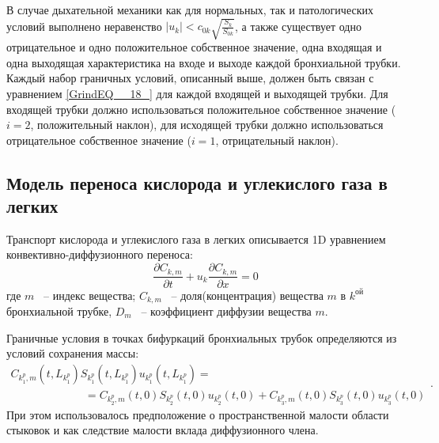 В случае дыхательной механики как для нормальных, так и патологических условий выполнено неравенство $\left|u_{k} \right|<c_{0k} \sqrt{\frac{S_{k} }{S_{0k} } } $, а также существует одно отрицательное и одно положительное собственное значение, одна входящая и одна выходящая характеристика на входе и выходе каждой бронхиальной трубки. Каждый набор граничных условий, описанный выше, должен быть связан с уравнением \eqref{GrindEQ__18_} для каждой входящей и выходящей трубки. Для входящей трубки должно использоваться положительное собственное значение ($i=2$, положительный наклон), для исходящей трубки должно использоваться отрицательное собственное значение ($i=1$, отрицательный наклон).

\subsection{Модель переноса кислорода и углекислого газа в легких}

Транспорт кислорода и углекислого газа в легких описывается 1D уравнением конвективно-диффузионного переноса:
\begin{equation} \label{GrindEQ__19_} 
\frac{\partial C_{k,m} }{\partial t} +u_{k} \frac{\partial C_{k,m} }{\partial x} =0  
\end{equation} 
где $m$ ~-- индекс вещества; $C_{k,m} $ ~-- доля(концентрация) вещества $m$ в $k^{ой} $ бронхиальной трубке, $D_{m} $ ~-- коэффициент диффузии вещества $m$. 

Граничные условия в точках бифуркаций бронхиальных трубок определяются из условий сохранения массы:
\begin{equation} \label{GrindEQ__20_} 
\begin{array}{l} {C_{k_{1}^{p} ,m} \left(t,L_{k_{1}^{p} } \right)S_{k_{1}^{p} } \left(t,L_{k_{1}^{p} } \right)u_{k_{1}^{p} } \left(t,L_{k_{1}^{p} } \right)=} \\ {\; \; \; \; \; \; \; \; \; \; \; \; \; \; \; \; \; \; \; \; \; \; \; \; =C_{k_{2}^{p} ,m} \left(t,0\right)S_{k_{2}^{p} } \left(t,0\right)u_{k_{2}^{p} } \left(t,0\right)+C_{k_{3}^{p} ,m} \left(t,0\right)S_{k_{3}^{p} } \left(t,0\right)u_{k_{3}^{p} } \left(t,0\right)} \end{array}.  
\end{equation} 
При этом использовалось предположение о пространственной малости области стыковок и как следствие малости вклада диффузионного члена.

